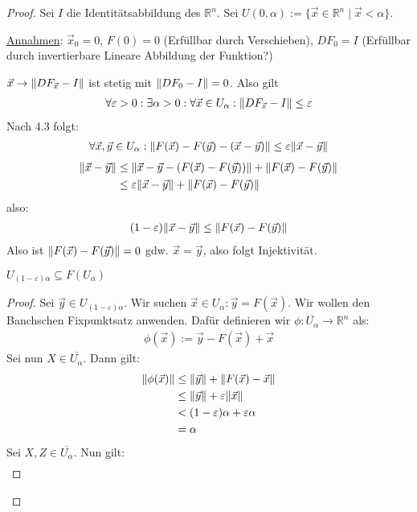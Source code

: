 \documentclass{report}
\renewcommand\epsilon{\varepsilon}
\newcommand*{\newpar}{\par\vspace{\baselineskip}\noindent}
\newcommand{\ul}[1]{\underline{#1}}
\newcommand{\bR}{\mathbb{R}}
\newcommand{\vx}{\vec{x}}
\newcommand{\vy}{\vec{y}}
\begin{document}
\begin{proof}
 Sei $I$ die Identitätsabbildung des $\bR^n$. Sei $U(0, \alpha) := \{\vx \in \bR^n \mid \vx < \alpha\}$.
 \newpar
 \ul{Annahmen}: $\vx_0 = 0$, $F(0) = 0$ (Erfüllbar durch Verschieben), $DF_0 = I$ (Erfüllbar durch invertierbare Lineare Abbildung der Funktion?)
 \newpar
 $\vx \to \norm{DF_{\vx} - I}$ ist stetig mit $\norm{DF_0 - I} = 0$. Also gilt
 \begin{align*}
  \forall \epsilon > 0 : \exists \alpha > 0 : \forall \vx \in U_\alpha : \norm{DF_{\vx} - I} \leq \epsilon
 \end{align*}
 Nach 4.3 folgt:
 \begin{align*}
  \forall \vx, \vy \in U_\alpha : \norm{F(\vx) - F(\vy) - (\vx-\vy)} \leq \epsilon \norm{\vx - \vy}
 \end{align*}
 \begin{align*}
  \norm{\vx - \vy} &\leq \norm{\vx - \vy - (F(\vx) - F(\vy))} + \norm{F(\vx) - F(\vy)}\\
  &\leq \epsilon \norm{\vx - \vy} + \norm{F(\vx) - F(\vy)}\\
 \end{align*}
 also:
 \begin{align*}
  (1- \epsilon)\norm{\vx - \vy} \leq \norm{F(\vx) - F(\vy)}
 \end{align*}
 Also ist $\norm{F(\vx) - F(\vy)} = 0$ gdw. $\vx = \vy$, also folgt Injektivität.
 \newpar
 \begin{lemma}
  $U_{(1-\epsilon)\alpha} \subseteq F(U_\alpha)$
 \end{lemma}
 \begin{proof}
  Sei $\vy \in U_{(1-\epsilon)\alpha}$. Wir suchen $\vx \in U_\alpha : \vy = F(\vx)$. Wir wollen den Banchschen Fixpunktsatz anwenden. Dafür definieren wir $\phi : \overline{U_\alpha} \to \bR^n$ als:
  \begin{align*}
   \phi(\vx) := \vy - F(\vx) + \vx
  \end{align*}
  Sei nun $X \in \overline{U_\alpha}$. Dann gilt:
  \begin{align*}
   \norm{\phi(\vx)} &\leq \norm{\vy} + \norm{F(\vx) - \vx}\\
                    &\leq \norm{\vy} + \epsilon \norm{\vx}\\
                    &< (1-\epsilon)\alpha + \epsilon \alpha\\
                    &= \alpha\\
  \end{align*}
  Sei $X,Z \in \overline{U_\alpha}$. Nun gilt:
  \begin{align*}

\end{align*}
\end{proof}
\end{proof}
\end{document}
